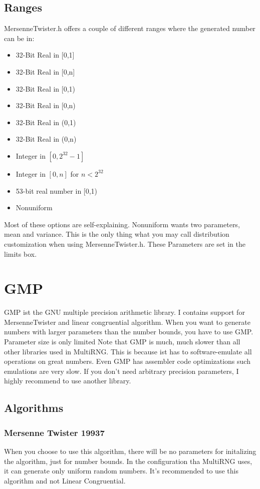 \documentclass{scrartcl}
\begin{document}
\subsection{Ranges}
MersenneTwister.h offers a couple of different ranges where the generated number can be in:
\begin{itemize}
	\item 32-Bit Real in [0,1]
	\item 32-Bit Real in [0,n]
	\item 32-Bit Real in [0,1)
	\item 32-Bit Real in [0,n)
	\item 32-Bit Real in (0,1)
	\item 32-Bit Real in (0,n)
	\item Integer in $[0,2^32-1]$
	\item Integer in $[0,n]$ for $n<2^{32}$
	\item 53-bit real number in [0,1)
	\item Nonuniform
\end{itemize}
Most of these options are self-explaining. Nonuniform wants two parameters, mean and variance. This is the only thing what you may call distribution customization when using MersenneTwister.h. These Parameters are set in the limits box.
\section{GMP}
GMP ist the GNU multiple precision arithmetic library. I contains support for MersenneTwister and linear congruential algorithm. When you want to generate numbers with larger parameters than the number bounds, you have to use GMP. Parameter size is only limited Note that GMP is much, much slower than all other libraries used in MultiRNG. This is because ist has to software-emulate all operations on great numbers. Even GMP has assembler code optimizations such emulations are very slow. If you don't need arbitrary precision parameters, I highly recommend to use another library.
\subsection{Algorithms}
\subsubsection{Mersenne Twister 19937}
When you choose to use this algorithm, there will be no parameters for initalizing the algorithm, just for number bounds. In the configuration tha MultiRNG uses, it can generate only uniform random numbers. It's recommended to use this algorithm and not Linear Congruential.
\end{document}
